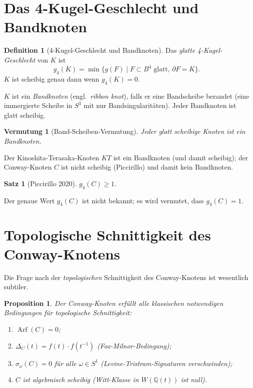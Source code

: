 \documentclass[12pt,a4paper]{amsart}
\newtheorem{proposition}[theorem]{Proposition}
\newtheorem{satz}[theorem]{Satz}
\newtheorem{vermutung}[theorem]{Vermutung}
\theoremstyle{definition}
\newtheorem{definition_de}[theorem]{Definition}
\theoremstyle{remark}
\DeclareMathOperator{\Arf}{Arf}
\newcommand{\Q}{\mathbb{Q}}
\begin{document}
\section{Das 4-Kugel-Geschlecht und Bandknoten}

\begin{definition_de}[4-Kugel-Geschlecht und Bandknoten]
Das \emph{glatte 4-Kugel-Geschlecht} von $K$ ist
\[
    g_4(K) = \min\{ g(F) \mid F \subset B^4 \text{ glatt, } \partial F = K \}.
\]
$K$ ist scheibig genau dann wenn $g_4(K) = 0$.

$K$ ist ein \emph{Bandknoten} (engl.\ \emph{ribbon knot}), falls er eine
Bandscheibe berandet (eine immergierte Scheibe in $S^3$ mit nur
Bandsingularitäten). Jeder Bandknoten ist glatt scheibig.
\end{definition_de}

\begin{vermutung}[Band-Scheiben-Vermutung]
\label{verm:ribbon-slice}
Jeder glatt scheibige Knoten ist ein Bandknoten.
\end{vermutung}

Der Kinoshita-Terasaka-Knoten $KT$ ist ein Bandknoten (und damit scheibig);
der Conway-Knoten $C$ ist nicht scheibig (Piccirillo) und damit kein Bandknoten.

\begin{satz}[Piccirillo 2020]
$g_4(C) \geq 1$.
\end{satz}

Der genaue Wert $g_4(C)$ ist nicht bekannt; es wird vermutet, dass $g_4(C) = 1$.

\section{Topologische Schnittigkeit des Conway-Knotens}

Die Frage nach der \emph{topologischen} Schnittigkeit des Conway-Knotens
ist wesentlich subtiler.

\begin{proposition}
Der Conway-Knoten erfüllt alle klassischen notwendigen Bedingungen für
topologische Schnittigkeit:
\begin{enumerate}[label=\roman*)]
\item $\Arf(C) = 0$;
\item $\Delta_C(t) = f(t) \cdot f(t^{-1})$ (Fox-Milnor-Bedingung);
\item $\sigma_\omega(C) = 0$ für alle $\omega \in S^1$ (Levine-Tristram-Signaturen verschwinden);
\item $C$ ist algebraisch scheibig (Witt-Klasse in $W(\Q(t))$ ist null).
\end{enumerate}
\end{proposition}
\end{document}
